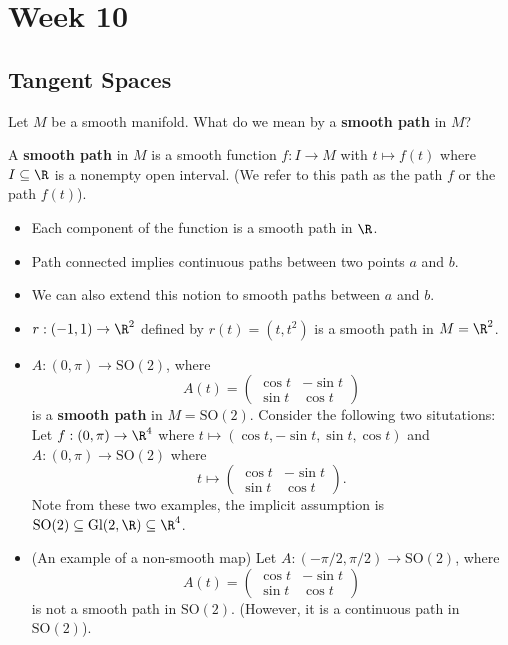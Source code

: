 \section{Week 10}

\subsection{Tangent Spaces}

   Let \( M  \) be a smooth manifold. What do we mean by a \textbf{smooth path} in \( M  \)?

\begin{definition}
    A \textbf{smooth path} in \( M  \) is a smooth function \( f : I \to M  \) with \( t \mapsto f(t) \) where \( I \subseteq \R  \) is a nonempty open interval. (We refer to this path as the path \( f  \) or the path \( f(t) \)). 
\end{definition}

\begin{itemize}
    \item Each component of the function is a smooth path in \( \R  \).
    \item Path connected implies continuous paths between two points \( a  \) and \( b  \).
    \item We can also extend this notion to smooth paths between \( a \) and \( b  \).
\end{itemize}

\begin{eg}
    \begin{itemize}
        \item \( r: (-1,1) \to \R^{2} \) defined by \( r(t) = (t, t^{2}) \) is a smooth path in \( M  = \R^{2} \).     
        \item \( A :  (0,\pi) \to \text{SO}(2) \), where 
            \[  A(t) = \begin{pmatrix} \cos t &  - \sin t \\ \sin t & \cos t \end{pmatrix} \]
            is a \textbf{smooth path} in \( M= \text{SO}(2) \). Consider the following two situtations: Let \( f: (0, \pi) \to \R^{4} \) where \( t \mapsto (\cos t , -\sin t , \sin t , \cos t) \) and \( A : (0,\pi) \to \text{SO}(2) \) where 
            \[  t \mapsto \begin{pmatrix} \cos t & - \sin t \\ \sin t & \cos t  \end{pmatrix}.  \]
            Note from these two examples, the implicit assumption is \( \text{SO}(2) \subseteq  \text{Gl}(2, \R) \subseteq  \R^{4}\).
            \item (An example of a non-smooth map) Let \( A : (- \pi / 2 , \pi / 2 ) \to \text{SO}(2) \), where 
            \[  A(t) = \begin{pmatrix} \cos t & - \sin t \\ \sin t & \cos t  \end{pmatrix}  \]
            is not a smooth path in \( \text{SO}(2) \). (However, it is a continuous path in \( \text{SO}(2) \)).
    \end{itemize}
\end{eg}

